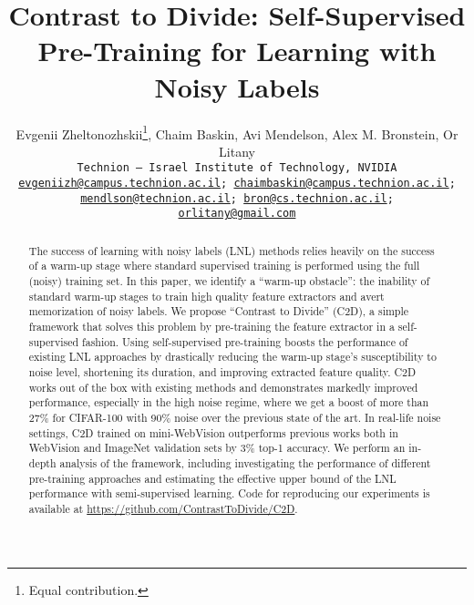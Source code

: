 \documentclass[10pt,twocolumn,letterpaper]{article}
\begin{document}
\title{Contrast to Divide: Self-Supervised Pre-Training for Learning with Noisy Labels}

\newcommand*\samethanks[1][\value{footnote}]{\footnotemark[#1]}
\author{Evgenii Zheltonozhskii\thanks{Equal contribution.}\hspace{4pt},
Chaim Baskin\samethanks[1]\hspace{4pt},
Avi Mendelson,
Alex M. Bronstein,
Or Litany\\
    {\tt\small Technion -- Israel Institute of Technology, NVIDIA}\\
{\tt\small \href{mailto:evgeniizh@campus.technion.ac.il}{evgeniizh@campus.technion.ac.il};
\href{mailto:chaimbaskin@campus.technion.ac.il}{chaimbaskin@campus.technion.ac.il};}\\
{\tt\small \href{mailto:mendlson@technion.ac.il}{mendlson@technion.ac.il};
\href{mailto:bron@cs.technion.ac.il}{bron@cs.technion.ac.il};}\\
{\tt\small \href{mailto:orlitany@gmail.com}{orlitany@gmail.com}}

}


\maketitle


\begin{abstract}
The success of learning with noisy labels (LNL) methods  relies heavily on the success of a warm-up stage where standard supervised training is performed using the full (noisy) training set. 
In this paper, we identify a ``warm-up obstacle'': the inability of standard warm-up stages to train high quality feature extractors and avert memorization of noisy labels. 
We propose ``Contrast to Divide'' (C2D), a simple framework that solves this problem by pre-training the feature extractor in a self-supervised fashion. 
Using self-supervised pre-training boosts the performance of existing LNL approaches by drastically reducing the warm-up stage's susceptibility to noise level, shortening its duration, and improving extracted feature quality. 
C2D works out of the box with existing methods and demonstrates markedly improved performance, especially in the high noise regime, where we get a boost of more than 27\% for CIFAR-100 with 90\% noise over the previous state of the art.
In real-life noise settings, C2D trained on mini-WebVision outperforms previous works both in WebVision and ImageNet validation sets by 3\% top-1 accuracy. 
We perform an in-depth analysis of the framework, including investigating the performance of different pre-training approaches and estimating the effective upper bound of the LNL performance with semi-supervised learning.
Code for reproducing our experiments is available at \url{https://github.com/ContrastToDivide/C2D}. 
\end{abstract}
\end{document}
